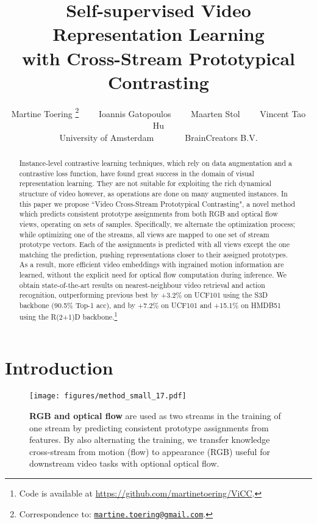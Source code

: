 \documentclass[10pt,twocolumn,letterpaper]{article}
\begin{document}
\title{Self-supervised Video Representation Learning \\with Cross-Stream Prototypical Contrasting}

\author{Martine Toering\! \thanks{Correspondence to: \scriptsize{\tt{\href{mailto:martine.toering@gmail.com}{martine.toering@gmail.com}}}.} \ \ \ \ Ioannis Gatopoulos\!  \ \ \ \ Maarten Stol\!  \ \ \ \ Vincent Tao Hu\!  \vspace{0.4em}\\
\normalsize{\! University of Amsterdam \ \ \ \ \ \ \! BrainCreators B.\!V.} \\
}




\maketitle


\begin{abstract}
Instance-level contrastive learning techniques, which rely on data augmentation and a contrastive loss function, have found great success in the domain of visual representation learning. They are not suitable for exploiting the rich dynamical structure of video however, as operations are done on many augmented instances. In this paper we propose ``Video Cross-Stream Prototypical Contrasting", a novel method which predicts consistent prototype assignments from both RGB and optical flow views, operating on sets of samples. Specifically, we alternate the optimization process; while optimizing one of the streams, all views are mapped to one set of stream prototype vectors. Each of the assignments is predicted with all views except the one matching the prediction, pushing representations closer to their assigned prototypes. As a result, more efficient video embeddings with ingrained motion information are learned, without the explicit need for optical flow computation during inference. We obtain state-of-the-art results on nearest-neighbour video retrieval and action recognition, outperforming previous best by +3.2\% on UCF101 using the S3D backbone (90.5\% Top-1 acc), and by +7.2\% on UCF101 and +15.1\% on HMDB51 using the R(2+1)D backbone.\footnote{\noindent Code is available at \scriptsize\url{https://github.com/martinetoering/ViCC}.}
\end{abstract}
 \section{Introduction}
\begin{figure}[t]
\begin{center}
   \texttt{[image: figures/method\_small\_17.pdf]}
\end{center}
   \caption{\textbf{RGB and optical flow} are used as two streams in the training of one stream by predicting consistent prototype assignments from features. By also alternating the training, we transfer knowledge cross-stream from motion (flow) to appearance (RGB) useful for downstream video tasks with optional optical flow.} 
   \label{fig:method_small}
\end{figure}
\end{document}
